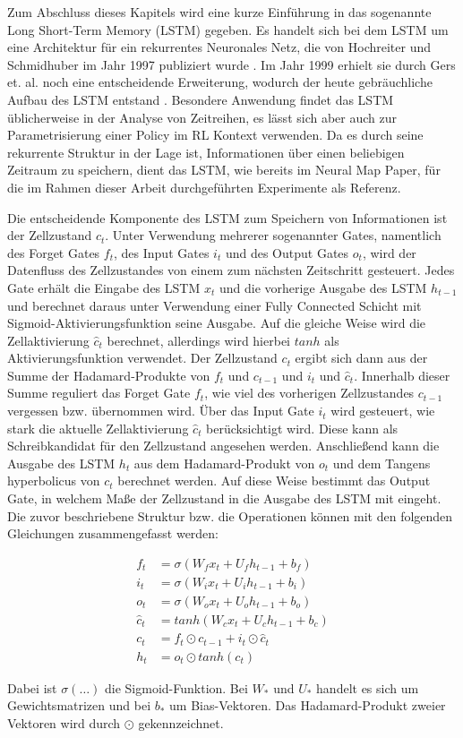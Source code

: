 Zum Abschluss dieses Kapitels wird eine kurze Einführung in das sogenannte Long Short-Term Memory (LSTM) gegeben. Es handelt sich bei dem LSTM um eine Architektur für ein rekurrentes Neuronales Netz, die von Hochreiter und Schmidhuber im Jahr 1997 publiziert wurde \cite{LSTM}. Im Jahr 1999 erhielt sie durch Gers et. al. noch eine entscheidende Erweiterung, wodurch der heute gebräuchliche Aufbau des LSTM entstand \cite{ForgetGate}. Besondere Anwendung findet das LSTM üblicherweise in der Analyse von Zeitreihen, es lässt sich aber auch zur Parametrisierung einer Policy im RL Kontext verwenden. Da es durch seine rekurrente Struktur in der Lage ist, Informationen über einen beliebigen Zeitraum zu speichern, dient das LSTM, wie bereits im Neural Map Paper, für die im Rahmen dieser Arbeit durchgeführten Experimente als Referenz.

Die entscheidende Komponente des LSTM zum Speichern von Informationen ist der Zellzustand $c_t$. Unter Verwendung mehrerer sogenannter Gates, namentlich des Forget Gates $f_t$, des Input Gates $i_t$ und des Output Gates $o_t$, wird der Datenfluss des Zellzustandes von einem zum nächsten Zeitschritt gesteuert. Jedes Gate erhält die Eingabe des LSTM $x_t$ und die vorherige Ausgabe des LSTM $h_{t-1}$ und berechnet daraus unter Verwendung einer Fully Connected Schicht mit Sigmoid-Aktivierungsfunktion seine Ausgabe. Auf die gleiche Weise wird die Zellaktivierung $\hat{c}_t$ berechnet, allerdings wird hierbei $tanh$ als Aktivierungsfunktion verwendet. Der Zellzustand $c_t$ ergibt sich dann aus der Summe der Hadamard-Produkte von $f_t$ und $c_{t-1}$ und  $i_t$ und $\hat{c}_t$. Innerhalb dieser Summe reguliert das Forget Gate $f_t$, wie viel des vorherigen Zellzustandes $c_{t-1}$ vergessen bzw. übernommen wird. Über das Input Gate $i_t$ wird gesteuert, wie stark die aktuelle Zellaktivierung $\hat{c}_t$ berücksichtigt wird. Diese kann als Schreibkandidat für den Zellzustand angesehen werden. Anschließend kann die Ausgabe des LSTM $h_t$ aus dem Hadamard-Produkt von $o_t$ und dem Tangens hyperbolicus von $c_t$ berechnet werden. Auf diese Weise bestimmt das Output Gate, in welchem Maße der Zellzustand in die Ausgabe des LSTM mit eingeht. Die zuvor beschriebene Struktur bzw. die Operationen können mit den folgenden Gleichungen zusammengefasst werden:

\begin{equation*}
\begin{align*}
	f_t &= \sigma(W_f x_t + U_f h_{t-1} + b_f) \\
	i_t &= \sigma(W_i x_t + U_i h_{t-1} + b_i) \\
	o_t &= \sigma(W_o x_t + U_o h_{t-1} + b_o) \\
	\hat{c}_t &= tanh(W_c x_t + U_c h_{t-1} + b_c) \\
	c_t &= f_t \odot c_{t-1} + i_t \odot \hat{c}_t \\
	h_t &= o_t \odot tanh(c_t)
\end{align*}
\end{equation*}

Dabei ist $\sigma(\dots)$ die Sigmoid-Funktion. Bei $W_*$ und $U_*$ handelt es sich um Gewichtsmatrizen und bei $b_*$ um Bias-Vektoren. Das Hadamard-Produkt zweier Vektoren wird durch $\odot$ gekennzeichnet.
